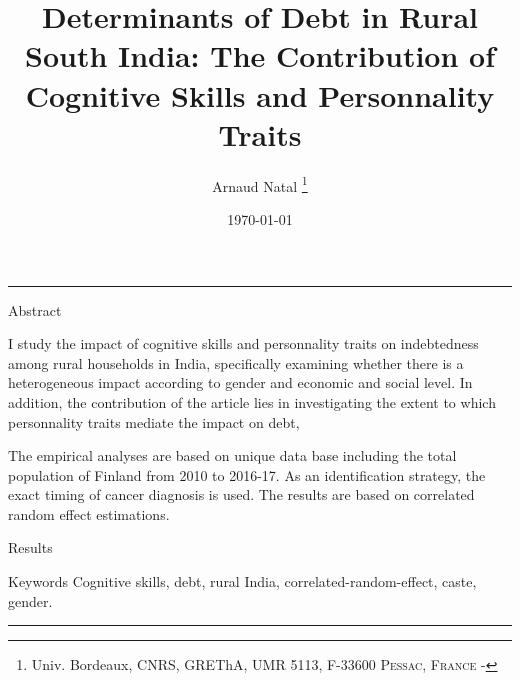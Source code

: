 \documentclass[a4paper, 11pt, onecolumn]{article}
\title{{Determinants of Debt in Rural South India: The Contribution of Cognitive Skills and Personnality Traits}}
\author{Arnaud Natal \thanks{Univ. Bordeaux, CNRS, GREThA, UMR 5113, F-33600 \textsc{Pessac, France} - \email{arnaud.natal@u-bordeaux.fr}}}
\date{\today}
\begin{document}
\maketitle

\hrule 
\vspace{0.3cm}

\begin{resab}{Abstract}

I study the impact of cognitive skills and personnality traits on indebtedness among rural households in India, specifically examining whether there is a heterogeneous impact according to gender and economic and social level.
In addition, the contribution of the article lies in investigating the extent to which personnality traits mediate the impact on debt, 

The empirical analyses are based on unique data base including the total population of Finland from 2010 to 2016-17. 
As an identification strategy, the exact timing of cancer diagnosis is used. 
The results are based on correlated random effect estimations. 

Results 

\end{resab}

\begin{motkey}{Keywords}
Cognitive skills, debt, rural India, correlated-random-effect, caste, gender.
\end{motkey}


\hrule



\end{document}

